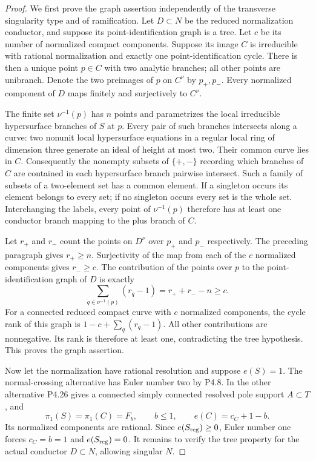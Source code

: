\begin{proof}
We first prove the graph assertion independently of
the transverse singularity type and of ramification.
Let $D\subset N$ be the reduced normalization conductor,
and suppose its point-identification graph is a tree.
Let $c$ be its number of normalized compact components.
Suppose its image $C$ is irreducible with rational
normalization and exactly one point-identification
cycle. There is then a unique point $p\in C$ with
two analytic branches; all other points are unibranch.
Denote the two preimages of $p$ on $C^\nu$ by
$p_+,p_-$. Every normalized component of $D$ maps
finitely and surjectively to $C^\nu$.

The finite set $\nu^{-1}(p)$ has $n$ points and
parametrizes the local irreducible hypersurface
branches of $S$ at $p$. Every pair of such branches
intersects along a curve: two nonunit local
hypersurface equations in a regular local ring of
dimension three generate an ideal of height at most
two. Their common curve lies in $C$. Consequently
the nonempty subsets of $\{+,-\}$ recording which
branches of $C$ are contained in each hypersurface
branch pairwise intersect. Such a family of subsets
of a two-element set has a common element. If a
singleton occurs its element belongs to every set;
if no singleton occurs every set is the whole set.
Interchanging the labels, every point of
$\nu^{-1}(p)$ therefore has at least one conductor
branch mapping to the plus branch of $C$.

Let $r_+$ and $r_-$ count the points on $D^\nu$
over $p_+$ and $p_-$ respectively. The preceding
paragraph gives $r_+\ge n$. Surjectivity of the
map from each of the $c$ normalized components
gives $r_-\ge c$. The contribution of the points
over $p$ to the point-identification graph of $D$
is exactly
\[
 \sum_{q\in\nu^{-1}(p)}(r_q-1)
       =r_++r_--n\ge c.
\]
For a connected reduced compact curve with $c$
normalized components, the cycle rank of this graph
is $1-c+\sum_q(r_q-1)$. All other contributions
are nonnegative. Its rank is therefore at least
one, contradicting the tree hypothesis.
This proves the graph assertion.

Now let the normalization have rational resolution
and suppose $e(S)=1$. The normal-crossing alternative
has Euler number two by P4.8. In the other alternative
P4.26 gives a connected simply connected resolved
pole support $A\subset T$, and
\[
 \pi_1(S)=\pi_1(C)=F_b,\qquad b\le1,
 \qquad e(C)=c_C+1-b.
\]
Its normalized components are rational.
Since $e(S_{\rm reg})\ge0$, Euler number one forces
$c_C=b=1$ and $e(S_{\rm reg})=0$.
It remains to verify the tree property for the
actual conductor $D\subset N$, allowing singular $N$.


\end{proof}
